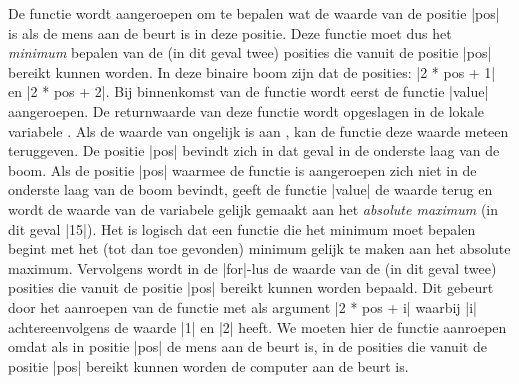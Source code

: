 \begin{cpplstShortInline}
De functie  wordt aangeroepen om te bepalen wat de waarde van de positie |pos| is als de mens aan de beurt is in deze positie.
Deze functie moet dus het \emph{minimum} bepalen van de (in dit geval twee) posities die vanuit de positie |pos| bereikt kunnen worden.
In deze binaire boom zijn dat de posities: |2 * pos + 1| en |2 * pos + 2|.
Bij binnenkomst van de functie  wordt eerst de functie |value| aangeroepen.
De returnwaarde van deze functie wordt opgeslagen in de lokale variabele .
Als de waarde van  ongelijk is aan , kan de functie  deze waarde meteen teruggeven.
De positie |pos| bevindt zich in dat geval in de onderste laag van de boom.
Als de positie |pos| waarmee de functie  is aangeroepen zich niet in de onderste laag van de boom bevindt, geeft de functie |value| de waarde  terug en wordt de waarde van de variabele  gelijk gemaakt aan het \emph{absolute maximum} (in dit geval |15|).
Het is logisch dat een functie die het minimum moet bepalen begint met het (tot dan toe gevonden) minimum gelijk te maken aan het absolute maximum.
Vervolgens wordt in de |for|\hyp{}lus de waarde van de (in dit geval twee) posities die vanuit de positie |pos| bereikt kunnen worden bepaald.
Dit gebeurt door het aanroepen van de functie  met als argument |2 * pos + i| waarbij |i| achtereenvolgens de waarde |1| en |2| heeft.
We moeten hier de functie  aanroepen omdat als in positie |pos| de mens aan de beurt is, in de posities die vanuit de positie |pos| bereikt kunnen worden de computer aan de beurt is.

\end{cpplstShortInline}
